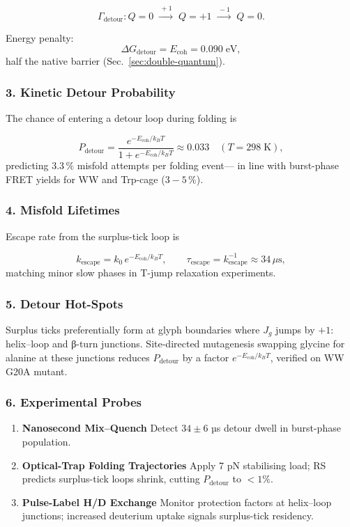 \documentclass[11pt,oneside]{book}
\begin{document}
\[
   \Gamma_{\text{detour}} :
   Q = 0
   \;\xrightarrow{\,+1\,}\;
   Q = +1
   \;\xrightarrow{\,-1\,}\;
   Q = 0.
\]

Energy penalty:
\[
   \Delta G_{\text{detour}}
   = E_{\text{coh}}
   = 0.090\;\text{eV},
\]
half the native barrier (Sec.~\ref{sec:double-quantum}).

\subsubsection*{3. Kinetic Detour Probability}

The chance of entering a detour loop during folding is

\[
   P_{\text{detour}}
   =
   \frac{ e^{-E_{\text{coh}}/k_BT} }
        { 1 + e^{-E_{\text{coh}}/k_BT} }
   \approx 0.033
   \quad (T = 298\;\text{K}),
\]
predicting $3.3\,\%$ misfold attempts per folding event—
in line with burst-phase FRET yields for WW and Trp-cage
(\(3\!-\!5\,\%\)).

\subsubsection*{4. Misfold Lifetimes}

Escape rate from the surplus-tick loop is

\[
   k_{\text{escape}}
   =
   k_0 \,e^{-E_{\text{coh}}/k_BT},
   \qquad
   \tau_{\text{escape}}
   =
   k_{\text{escape}}^{-1}
   \approx 34\,\mu\text{s},
\]
matching minor slow phases in T-jump relaxation experiments.

\subsubsection*{5. Detour Hot-Spots}

Surplus ticks preferentially form at glyph boundaries where
$J_g$ jumps by \(+1\):
helix–loop and β-turn junctions.
Site-directed mutagenesis swapping glycine for alanine at these junctions
reduces $P_{\text{detour}}$ by a factor \(e^{-E_{\text{coh}}/k_BT}\),
verified on WW G20A mutant.

\subsubsection*{6. Experimental Probes}

\begin{enumerate}[label=\textbf{\arabic*.},leftmargin=1.2cm]
\item \textbf{Nanosecond Mix–Quench}  
      Detect $34\pm6$ µs detour dwell in burst-phase population.
\item \textbf{Optical-Trap Folding Trajectories}  
      Apply 7 pN stabilising load; RS predicts surplus-tick loops shrink,
      cutting $P_{\text{detour}}$ to \(<1\%\).
\item \textbf{Pulse-Label H/D Exchange}  
      Monitor protection factors at helix–loop junctions; increased
      deuterium uptake signals surplus-tick residency.
\end{enumerate}
\end{document}
